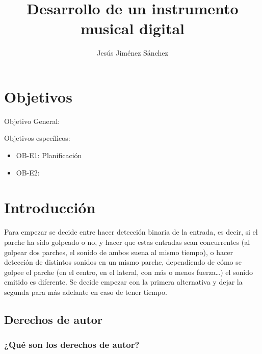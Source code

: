\documentclass{article}
\title{Desarrollo de un instrumento musical digital}
\author{ Jesús Jiménez Sánchez }
\begin{document}
\maketitle

\newpage
\tableofcontents
\newpage

\section*{Objetivos} %
\label{sec:Objetivos}

    Objetivo General:

    Objetivos específicos:
    \begin{itemize}
        \item OB-E1: Planificación
        \item OB-E2:
    \end{itemize}


\section{Introducción} %
\label{sec:Introduccion}

    Para empezar se decide entre hacer detección binaria de la entrada, es decir, si el parche ha sido golpeado o no, y
    hacer que estas entradas sean concurrentes (al golpear dos parches, el sonido de ambos suena al mismo tiempo), o
    hacer detección de distintos sonidos en un mismo parche, dependiendo de cómo se golpee el parche (en el centro, en
    el lateral, con más o menos fuerza…) el sonido emitido es diferente.\newline
    Se decide empezar con la primera alternativa y dejar la segunda para más adelante en caso de tener tiempo.

    \subsection{Derechos de autor} %
    \label{sub:DerechosDeAutor}
        \subsubsection{¿Qué son los derechos de autor?} %
        \label{ssub:QueSonLosDerechosDeAutor}
\end{document}
